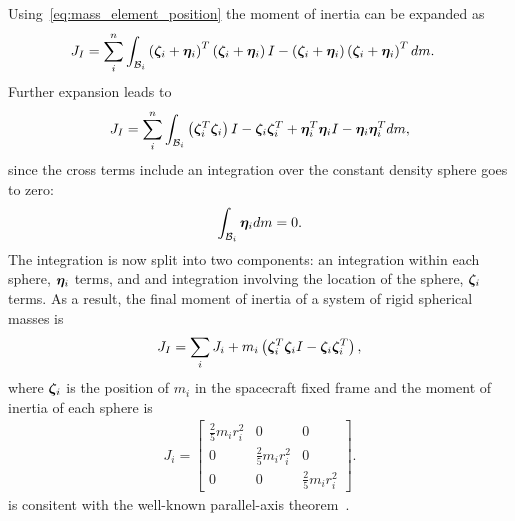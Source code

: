 Using~\cref{eq:mass_element_position} the moment of inertia can be expanded as
\begin{align*}
    J_I &= \sum_i^n \int_{\mathcal{B}_i} \left( \bm{\zeta}_i + \bm{\eta}_i \right)^T \left( \bm{\zeta}_i + \bm{\eta}_i  \right) I  - \left( \bm{\zeta}_i + \bm{\eta}_i \right) \left( \bm{\zeta}_i + \bm{\eta}_i \right)^T dm .
\end{align*}
Further expansion leads to
\begin{align*}
    J_I = \sum_i^n \int_{\mathcal{B}_i} \left( \bm{\zeta}_i^T \bm{\zeta}_i \right)I - \bm{\zeta}_i \bm{\zeta}_i^T + \bm{\eta}_i^T \bm{\eta}_i I - \bm{\eta}_i \bm{\eta}_i^T dm, 
\end{align*}
since the cross terms include an integration over the constant density sphere goes to zero:
\begin{align*}
    \int_{\mathcal{B}_i} \bm{\eta}_i dm = 0 .
\end{align*}
The integration is now split into two components: an integration within each sphere, \( \bm{\eta}_i \) terms, and and integration involving the location of the sphere, \( \bm{\zeta}_i \) terms.
As a result, the final moment of inertia of a system of rigid spherical masses is 
\begin{align}\label{eq:dumbbell_moment_of_inertia}
    J_I = \sum_i J_i + m_i \left( \bm{\zeta}_i^T \bm{\zeta}_i I - \bm{\zeta}_i \bm{\zeta}_i^T \right) , 
\end{align}
where \( \bm{\zeta}_i \) is the position of \( m_i \) in the spacecraft fixed frame and the moment of inertia of each sphere is
\begin{align}\label{eq:sphere_moment_of_inertia}
    J_i = \begin{bmatrix} 
        \frac{2}{5} m_i r_i^2 & 0 & 0 \\
        0 & \frac{2}{5} m_i r_i^2 & 0 \\
        0 & 0 & \frac{2}{5} m_i r_i^2 
    \end{bmatrix}.
\end{align}
 is consitent with the well-known parallel-axis theorem~\cite{greenwood1988}.

